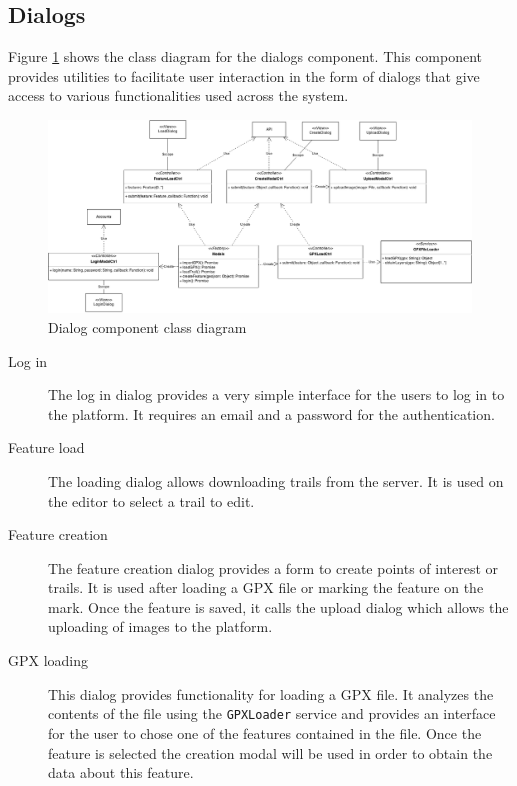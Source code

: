 \FloatBarrier
\subsection{Dialogs}

Figure \ref{fig:dialogs-component} shows the class diagram for the dialogs component. This component provides utilities to facilitate user interaction in the form of dialogs that give access to various functionalities used across the system. 

\begin{figure}[ht]
  \centering
  \includegraphics[width=.8\textwidth]{fig/modals-component}
  \caption{Dialog component class diagram}
  \label{fig:dialogs-component}
\end{figure}

\begin{description}
\item[Log in] The log in dialog provides a very simple interface for the users to log in to the platform. It requires an email and a password for the authentication.
\item[Feature load] The loading dialog allows downloading trails from the server. It is used on the editor to select a trail to edit.
\item[Feature creation] The feature creation dialog provides a form to create points of interest or trails. It is used after loading a GPX file or marking the feature on the mark. Once the feature is saved, it calls the upload dialog which allows the uploading of images to the platform.
\item[GPX loading] This dialog provides functionality for loading a GPX file. It analyzes the contents of the file using the \texttt{GPXLoader} service and provides an interface for the user to chose one of the features contained in the file. Once the feature is selected the creation modal will be used in order to obtain the data about this feature.
\end{description}

